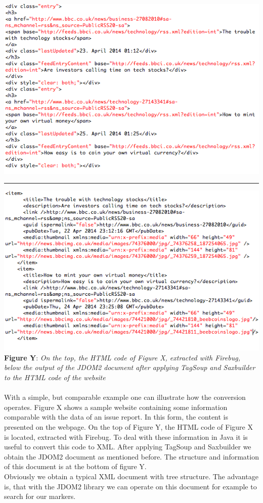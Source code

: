 \\\includegraphics[width=\textwidth]{html_ausschnitt.png} \\ \hrule \includegraphics[width=1.0\textwidth]{xml_ausschnitt.png}  \\\textbf{Figure Y}: \textit{On the top, the HTML code of Figure X, extracted with Firebug, below the output of the JDOM2 document after applying TagSoup and Saxbuilder to the HTML code of the website}  \\ \\ \newpage With a simple, but comparable example one can illustrate how the conversion operates. Figure X shows a sample website containing some information comparable with the data of an issue report. In this form, the content is presented on the webpage. On the top of Figure Y, the HTML code of Figure X is located, extracted with Firebug. To deal with these information in Java it is useful to convert this code to XML. After applying TagSoup and Saxbuilder we obtain the JDOM2 document as mentioned before. The structure and information of this document is at the bottom of figure Y.\\ Obviously we obtain a typical XML document with tree structure. The advantage is, that with the JDOM2 library we can operate on this document for example to search for our markers. 


